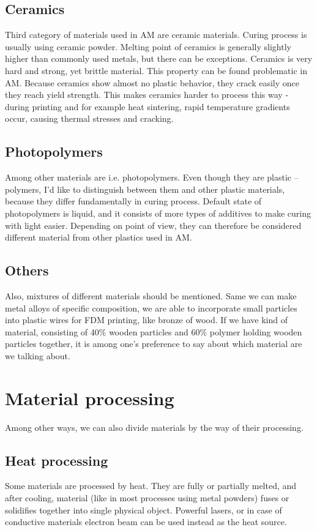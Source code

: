 \documentclass[a4paper, twoside, 11pt]{report}
\begin{document}
\subsection{Ceramics}
Third category of materials used in AM are ceramic materials. Curing process is usually using ceramic powder. Melting point of ceramics is generally slightly higher than commonly used metals, but there can be exceptions. Ceramics is very hard and strong, yet brittle material. This property can be found problematic in AM. Because ceramics show almost no plastic behavior, they crack easily once they reach yield strength. This makes ceramics harder to process this way - during printing and for example heat sintering, rapid temperature gradients occur, causing thermal stresses and cracking.
\subsection{Photopolymers}
Among other materials are i.e. photopolymers. Even though they are plastic – polymers, I'd like to distinguish between them and other plastic materials, because they differ fundamentally in curing process. Default state of photopolymers is liquid, and it consists of more types of additives to make curing with light easier. Depending on point of view, they can therefore be considered different material from other plastics used in AM.
\subsection{Others}
Also, mixtures of different materials should be mentioned. Same we can make metal alloys of specific composition, we are able to incorporate small particles into plastic wires for FDM printing, like bronze of wood. If we have kind of material, consisting of 40\% wooden particles and 60\% polymer holding wooden  particles together, it is among one’s preference to say about which material are we talking about.\cite{WoodenFilament}
\section{Material processing}
Among other ways, we can also divide materials by the way of their processing.
\subsection{Heat processing} Some materials are processed by heat. They are fully or partially melted, and after cooling, material (like in most processes using metal powders) fuses or solidifies together into single physical object. Powerful lasers, or in case of conductive materials electron beam can be used instead as the heat source.
\end{document}
